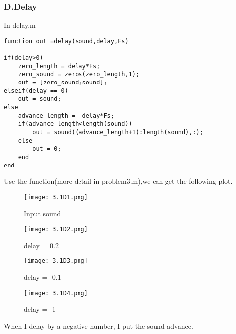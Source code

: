 \documentclass{article}
\begin{document}
\subsubsection*{D.Delay}
In delay.m
\begin{lstlisting}
function out =delay(sound,delay,Fs)

if(delay>0)
    zero_length = delay*Fs;
    zero_sound = zeros(zero_length,1);
    out = [zero_sound;sound];
elseif(delay == 0)
    out = sound;
else
    advance_length = -delay*Fs;
    if(advance_length<length(sound))
        out = sound((advance_length+1):length(sound),:);
    else
        out = 0;
    end
end
\end{lstlisting}
Use the function(more detail in problem3.m),we can get the following plot.\par
\begin{figure}[h]
    \begin{minipage}{0.45\textwidth}
        \centering
        \texttt{[image: 3.1D1.png]}
        \caption{Input sound}
    \end{minipage}
    \begin{minipage}{0.45\textwidth}
        \centering
        \texttt{[image: 3.1D2.png]}
        \caption{delay = 0.2}
    \end{minipage}
    \quad

    \begin{minipage}{0.45\textwidth}
        \centering
        \texttt{[image: 3.1D3.png]}
        \caption{delay = -0.1}
    \end{minipage}
    \begin{minipage}{0.45\textwidth}
        \centering
        \texttt{[image: 3.1D4.png]}
        \caption{delay = -1}
    \end{minipage}
\end{figure}
When I delay by a negative number, I put the sound advance.
\end{document}
